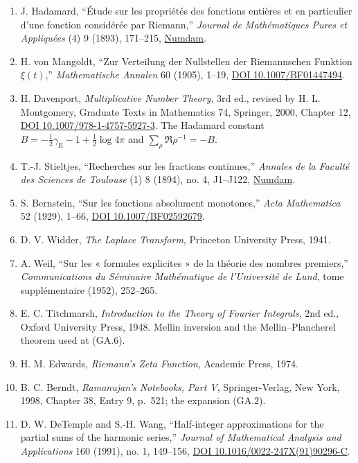 \documentclass[
  11pt,
]{book}
\begin{document}
\begin{enumerate}
{  10.1007/s11139-005-0834-4}.
\item
  J. Hadamard, ``Étude sur les propriétés des fonctions entières et en
  particulier d'une fonction considérée par Riemann,'' \emph{Journal de
  Mathématiques Pures et Appliquées} (4) 9 (1893), 171--215,
  \href{http://www.numdam.org/item/JMPA_1893_4_9__171_0/}{Numdam}.
\item
  H. von Mangoldt, ``Zur Verteilung der Nullstellen der Riemannschen
  Funktion \(\xi(t)\),'' \emph{Mathematische Annalen} 60 (1905), 1--19,
  \href{https://doi.org/10.1007/BF01447494}{DOI 10.1007/BF01447494}.
\item
  H. Davenport, \emph{Multiplicative Number Theory}, 3rd ed., revised by
  H. L. Montgomery, Graduate Texts in Mathematics 74, Springer, 2000,
  Chapter 12, \href{https://doi.org/10.1007/978-1-4757-5927-3}{DOI
  10.1007/978-1-4757-5927-3}. The Hadamard constant
  \(B=-\tfrac12\gamma_{\mathrm E}-1+\tfrac12\log4\pi\) and
  \(\sum_\rho\Re\rho^{-1}=-B\).
\item
  T.-J. Stieltjes, ``Recherches sur les fractions continues,''
  \emph{Annales de la Faculté des Sciences de Toulouse} (1) 8 (1894),
  no. 4, J1--J122,
  \href{http://www.numdam.org/item/AFST_1894_1_8_4_J1_0/}{Numdam}.
\item
  S. Bernstein, ``Sur les fonctions absolument monotones,'' \emph{Acta
  Mathematica} 52 (1929), 1--66,
  \href{https://doi.org/10.1007/BF02592679}{DOI 10.1007/BF02592679}.
\item
  D. V. Widder, \emph{The Laplace Transform}, Princeton University
  Press, 1941.
\item
  A. Weil, ``Sur les « formules explicites » de la théorie des nombres
  premiers,'' \emph{Communications du Séminaire Mathématique de
  l'Université de Lund}, tome supplémentaire (1952), 252--265.
\item
  E. C. Titchmarsh, \emph{Introduction to the Theory of Fourier
  Integrals}, 2nd ed., Oxford University Press, 1948. Mellin inversion
  and the Mellin--Plancherel theorem used at (GA.6).
\item
  H. M. Edwards, \emph{Riemann's Zeta Function}, Academic Press, 1974.
\item
  B. C. Berndt, \emph{Ramanujan's Notebooks, Part V}, Springer-Verlag,
  New York, 1998, Chapter 38, Entry 9, p.~521; the expansion (GA.2).
\item
  D. W. DeTemple and S.-H. Wang, ``Half-integer approximations for the
  partial sums of the harmonic series,'' \emph{Journal of Mathematical
  Analysis and Applications} 160 (1991), no. 1, 149--156,
  \href{https://doi.org/10.1016/0022-247X(91)90296-C}{DOI
  10.1016/0022-247X(91)90296-C}.
\end{enumerate}

\endgroup

\backmatter
\end{document}
